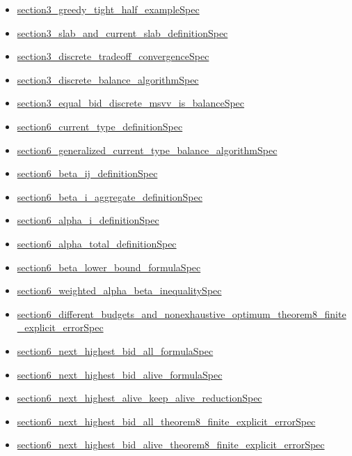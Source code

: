 \documentclass[10pt]{article}
\begin{document}
\begin{itemize}[leftmargin=1.2em]
\begin{itemize}[leftmargin=1.2em]
\item \hyperlink{source-claim-aa89dcfdc20d7b16}{section3\_greedy\_tight\_half\_exampleSpec}
\item \hyperlink{source-claim-61c2a66bd80f6c89}{section3\_slab\_and\_current\_slab\_definitionSpec}
\item \hyperlink{source-claim-df2397a4d99a767a}{section3\_discrete\_tradeoff\_convergenceSpec}
\item \hyperlink{source-claim-a30559fb9711d61f}{section3\_discrete\_balance\_algorithmSpec}
\item \hyperlink{source-claim-118770ec0ef80170}{section3\_equal\_bid\_discrete\_msvv\_is\_balanceSpec}
\item \hyperlink{source-claim-8897af29d98791bc}{section6\_current\_type\_definitionSpec}
\item \hyperlink{source-claim-712b6f4e89d119c6}{section6\_generalized\_current\_type\_balance\_algorithmSpec}
\item \hyperlink{source-claim-f639bf63e3f8af10}{section6\_beta\_ij\_definitionSpec}
\item \hyperlink{source-claim-3afc6a9cc9ca101b}{section6\_beta\_i\_aggregate\_definitionSpec}
\item \hyperlink{source-claim-55f70a71de7bceef}{section6\_alpha\_i\_definitionSpec}
\item \hyperlink{source-claim-2f7b2f5085f64f71}{section6\_alpha\_total\_definitionSpec}
\item \hyperlink{source-claim-eebe44ff8b8096af}{section6\_beta\_lower\_bound\_formulaSpec}
\item \hyperlink{source-claim-f472537a93482b1e}{section6\_weighted\_alpha\_beta\_inequalitySpec}
\item \hyperlink{source-claim-e276f37710146cbe}{section6\_different\_budgets\_and\_nonexhaustive\_optimum\_theorem8\_finite\_explicit\_errorSpec}
\item \hyperlink{source-claim-f235ff3a2d4fdaaf}{section6\_next\_highest\_bid\_all\_formulaSpec}
\item \hyperlink{source-claim-d54c7e56ec441d30}{section6\_next\_highest\_bid\_alive\_formulaSpec}
\item \hyperlink{source-claim-3321ada5aace06ac}{section6\_next\_highest\_alive\_keep\_alive\_reductionSpec}
\item \hyperlink{source-claim-ed72f055bf24b97e}{section6\_next\_highest\_bid\_all\_theorem8\_finite\_explicit\_errorSpec}
\item \hyperlink{source-claim-bcd3edd2a765f0d2}{section6\_next\_highest\_bid\_alive\_theorem8\_finite\_explicit\_errorSpec}

\end{itemize}
\end{itemize}
\end{document}
